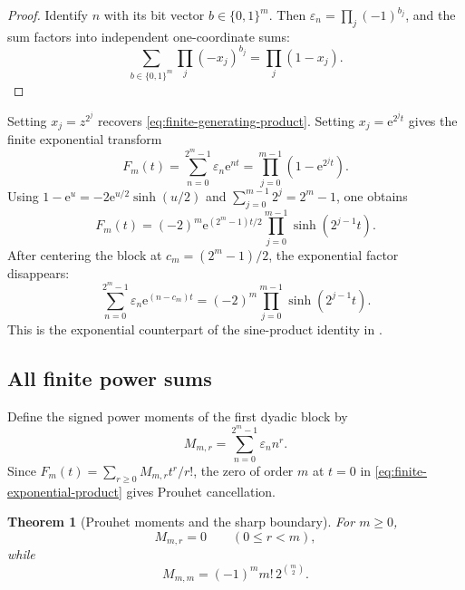 \documentclass[11pt,oneside]{article}
\newtheorem{theorem}{Theorem}[section]
\theoremstyle{definition}
\theoremstyle{remark}
\newcommand{\e}{\mathrm e}
\newcommand{\eps}{\varepsilon}
\begin{document}
\begin{proof}
Identify \(n\) with its bit vector \(b\in\{0,1\}^m\).  Then
\(\eps_n=\prod_j(-1)^{b_j}\), and the sum factors into independent
one-coordinate sums:
\[
  \sum_{b\in\{0,1\}^m}\prod_j(-x_j)^{b_j}
   =\prod_j(1-x_j).
\]
\end{proof}

Setting \(x_j=z^{2^j}\) recovers
\eqref{eq:finite-generating-product}.  Setting
\(x_j=\e^{2^jt}\) gives the finite exponential transform
\begin{equation}
  F_m(t)=\sum_{n=0}^{2^m-1}\eps_n\e^{nt}
        =\prod_{j=0}^{m-1}(1-\e^{2^jt}).
  \label{eq:finite-exponential-product}
\end{equation}
Using
\(1-\e^u=-2\e^{u/2}\sinh(u/2)\) and
\(\sum_{j=0}^{m-1}2^j=2^m-1\), one obtains
\begin{equation}
  F_m(t)=(-2)^m
    \e^{(2^m-1)t/2}
    \prod_{j=0}^{m-1}\sinh(2^{j-1}t).
  \label{eq:exponential-sinh}
\end{equation}
After centering the block at \(c_m=(2^m-1)/2\), the exponential factor
disappears:
\begin{equation}
  \boxed{
  \sum_{n=0}^{2^m-1}\eps_n\e^{(n-c_m)t}
   =(-2)^m\prod_{j=0}^{m-1}\sinh(2^{j-1}t).}
  \label{eq:centered-exponential}
\end{equation}
This is the exponential counterpart of the sine-product identity in
.

\subsection{All finite power sums}

Define the signed power moments of the first dyadic block by
\begin{equation}
  M_{m,r}=\sum_{n=0}^{2^m-1}\eps_n n^r.
  \label{eq:power-moment-definition}
\end{equation}
Since \(F_m(t)=\sum_{r\ge0}M_{m,r}t^r/r!\), the zero of order \(m\) at
\(t=0\) in \eqref{eq:finite-exponential-product} gives Prouhet cancellation.

\begin{theorem}[Prouhet moments and the sharp boundary]
For \(m\ge0\),
\begin{equation}
  M_{m,r}=0\qquad(0\le r<m),
  \label{eq:prouhet-zero}
\end{equation}
while
\begin{equation}
  \boxed{
  M_{m,m}=(-1)^m m!\,2^{\binom m2}.}
  \label{eq:prouhet-boundary}
\end{equation}
\end{theorem}
\end{document}
